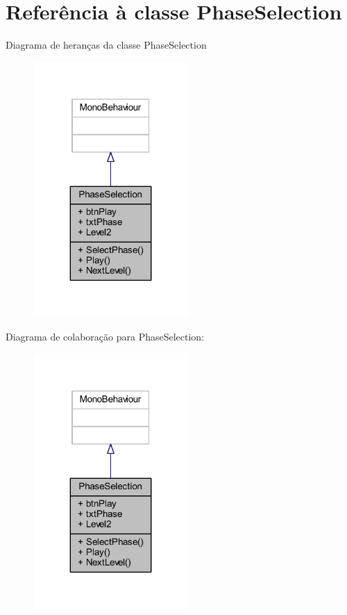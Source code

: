 \section{Referência à classe Phase\+Selection}
\label{class_phase_selection}


Diagrama de heranças da classe Phase\+Selection
\nopagebreak
\begin{figure}[H]
\begin{center}
\leavevmode
\includegraphics[width=167pt]{class_phase_selection__inherit__graph}
\end{center}
\end{figure}


Diagrama de colaboração para Phase\+Selection\+:
\nopagebreak
\begin{figure}[H]
\begin{center}
\leavevmode
\includegraphics[width=167pt]{class_phase_selection__coll__graph}
\end{center}
\end{figure}
